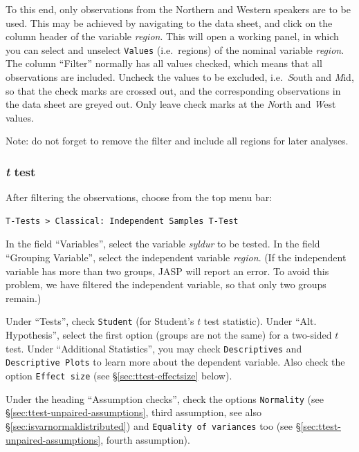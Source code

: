 \documentclass[
]{book}
\begin{document}
To this end, only observations from the Northern and Western speakers are to be used. This may be achieved by navigating to the data sheet, and click on the column header of the variable \emph{region}. This will open a working panel, in which you can select and unselect \texttt{Values} (i.e.~regions) of the nominal variable \emph{region}. The column ``Filter'' normally has all values checked, which means that all observations are included. Uncheck the values to be excluded, i.e.~\emph{S}outh and \emph{M}id, so that the check marks are crossed out, and the corresponding observations in the data sheet are greyed out. Only leave check marks at the \emph{N}orth and \emph{W}est values.

Note: do not forget to remove the filter and include all regions for later analyses.

\hypertarget{t-test}{%
\subsubsection{\texorpdfstring{\emph{t} test}{t test}}\label{t-test}}

After filtering the observations, choose from the top menu bar:

\begin{verbatim}
T-Tests > Classical: Independent Samples T-Test
\end{verbatim}

In the field ``Variables'', select the variable \emph{syldur} to be tested.
In the field ``Grouping Variable'', select the independent variable \emph{region}. (If the independent variable has more than two groups, JASP will report an error. To avoid this problem, we have filtered the independent variable, so that only two groups remain.)

Under ``Tests'', check \texttt{Student} (for Student's \(t\) test statistic). Under ``Alt. Hypothesis'', select the first option (groups are not the same) for a two-sided \(t\) test.
Under ``Additional Statistics'', you may check \texttt{Descriptives} and \texttt{Descriptive\ Plots} to learn more about the dependent variable. Also check the option \texttt{Effect\ size} (see §\ref{sec:ttest-effectsize} below).

Under the heading ``Assumption checks'', check the options \texttt{Normality} (see
§\ref{sec:ttest-unpaired-assumptions}, third assumption, see also\\
§\ref{sec:isvarnormaldistributed}) and \texttt{Equality\ of\ variances} too (see §\ref{sec:ttest-unpaired-assumptions}, fourth assumption).
\end{document}
